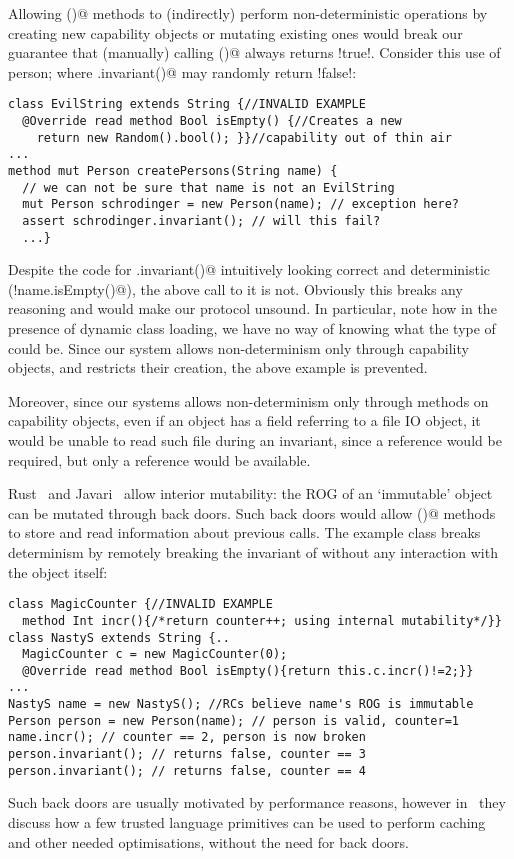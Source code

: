  Allowing \Q@invariant()@ methods to (indirectly) perform non-deterministic operations by creating new capability objects or mutating existing ones would break our guarantee that (manually) calling \Q@invariant()@ always returns \Q!true!.
Consider this use of person; where \Q@myPerson.invariant()@ may randomly return \Q!false!:
\begin{lstlisting}[morekeywords={assert}]
class EvilString extends String {//INVALID EXAMPLE
  @Override read method Bool isEmpty() {//Creates a new
    return new Random().bool(); }}//capability out of thin air
...
method mut Person createPersons(String name) {
  // we can not be sure that name is not an EvilString
  mut Person schrodinger = new Person(name); // exception here?
  assert schrodinger.invariant(); // will this fail?
  ...}
\end{lstlisting}
Despite the code for \Q@Person.invariant()@ intuitively looking correct and deterministic (\Q@!name.isEmpty()@), the above call to it is not. Obviously this breaks any reasoning and would make our protocol unsound. 
In particular, note how in the presence of dynamic class loading, we have no way of knowing what the type of \Q@name@ could be. Since our system allows non-determinism only through capability objects, and 
restricts their creation, the above example is prevented.

Moreover, since our systems allows  
non-determinism only through \Q@mut@ methods on capability objects, 
even if an object has a \Q@capsule@ field referring to a file IO object, it would be unable to read such file during an invariant, since a \Q@mut@ reference would be required, but only a \Q@read@ reference would be available.

Rust~\cite{matsakis2014rust} and Javari~\cite{TschantzErnst05}
allow interior mutability:
the ROG of an `immutable' object can be mutated through back doors.
Such back doors would allow \Q@invariant()@ methods to store and read information about previous calls.
The example class \Q@MagicCounter@ breaks determinism by
remotely breaking the invariant of \Q@person@ without any interaction with the \Q@person@ object itself:
\begin{lstlisting}
class MagicCounter {//INVALID EXAMPLE
  method Int incr(){/*return counter++; using internal mutability*/}}
class NastyS extends String {..
  MagicCounter c = new MagicCounter(0);
  @Override read method Bool isEmpty(){return this.c.incr()!=2;}}
...
NastyS name = new NastyS(); //RCs believe name's ROG is immutable
Person person = new Person(name); // person is valid, counter=1
name.incr(); // counter == 2, person is now broken
person.invariant(); // returns false, counter == 3
person.invariant(); // returns false, counter == 4
\end{lstlisting}
Such back doors are usually motivated by performance reasons, however in~\cite{GordonEtAl12} they
discuss how a few trusted language primitives can be used to perform caching and other needed optimisations,
without the need for back doors.


